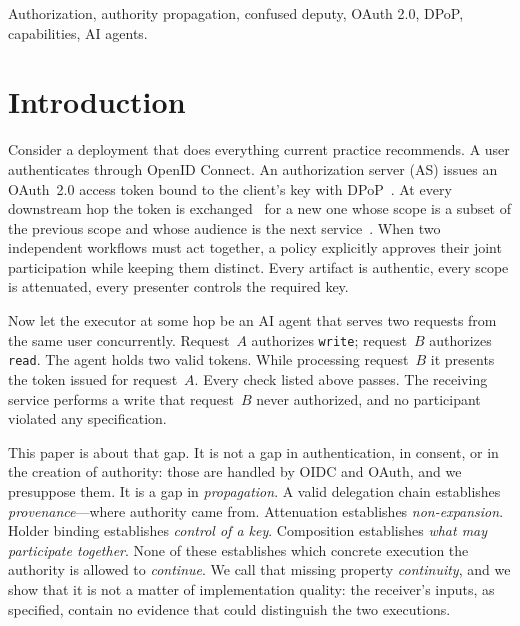 \documentclass[conference]{IEEEtran}
\begin{document}
\begin{IEEEkeywords}
Authorization, authority propagation, confused deputy, OAuth 2.0, DPoP, capabilities, AI agents.
\end{IEEEkeywords}

\section{Introduction}\label{sec:intro}

Consider a deployment that does everything current practice recommends. A user authenticates through OpenID Connect. An authorization server (AS) issues an OAuth~2.0 access token bound to the client's key with DPoP~\cite{rfc9449}. At every downstream hop the token is exchanged~\cite{rfc8693} for a new one whose scope is a subset of the previous scope and whose audience is the next service~\cite{rfc8707}. When two independent workflows must act together, a policy explicitly approves their joint participation while keeping them distinct. Every artifact is authentic, every scope is attenuated, every presenter controls the required key.

Now let the executor at some hop be an AI agent that serves two requests from the same user concurrently. Request~$A$ authorizes \texttt{write}; request~$B$ authorizes \texttt{read}. The agent holds two valid tokens. While processing request~$B$ it presents the token issued for request~$A$. Every check listed above passes. The receiving service performs a write that request~$B$ never authorized, and no participant violated any specification.

This paper is about that gap. It is not a gap in authentication, in consent, or in the creation of authority: those are handled by OIDC and OAuth, and we presuppose them. It is a gap in \emph{propagation}. A valid delegation chain establishes \emph{provenance}---where authority came from. Attenuation establishes \emph{non-expansion}. Holder binding establishes \emph{control of a key}. Composition establishes \emph{what may participate together}. None of these establishes which concrete execution the authority is allowed to \emph{continue}. We call that missing property \emph{continuity}, and we show that it is not a matter of implementation quality: the receiver's inputs, as specified, contain no evidence that could distinguish the two executions.
\end{document}
